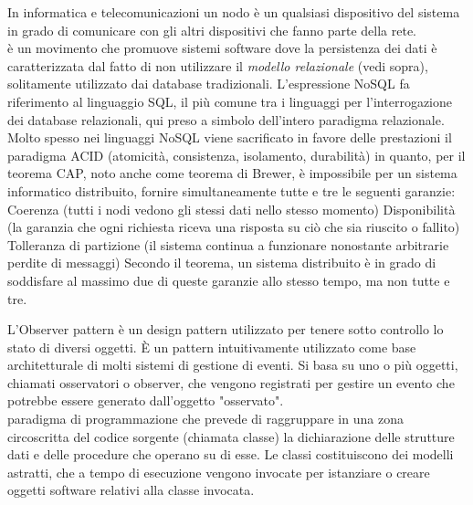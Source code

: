 \documentclass{scalatekids-article}
\begin{document}

   In informatica e telecomunicazioni un nodo è un qualsiasi dispositivo del sistema in grado di comunicare con gli altri dispositivi che fanno parte della rete.
  \\

   è un movimento che promuove sistemi software dove la persistenza dei dati è caratterizzata dal fatto di non utilizzare il \textit{modello relazionale} (vedi sopra), solitamente utilizzato dai database tradizionali.
  L'espressione NoSQL fa riferimento al linguaggio SQL, il più comune tra i linguaggi per l'interrogazione dei database relazionali, qui preso a simbolo dell'intero paradigma relazionale. Molto spesso nei linguaggi NoSQL viene sacrificato in favore delle prestazioni il paradigma ACID (atomicità, consistenza, isolamento, durabilità) in quanto, per il teorema CAP, noto anche come teorema di Brewer, è impossibile per un sistema informatico distribuito, fornire simultaneamente tutte e tre le seguenti garanzie:
  Coerenza (tutti i nodi vedono gli stessi dati nello stesso momento)
  Disponibilità (la garanzia che ogni richiesta riceva una risposta su ciò che sia riuscito o fallito)
  Tolleranza di partizione (il sistema continua a funzionare nonostante arbitrarie perdite di messaggi)
  Secondo il teorema, un sistema distribuito è in grado di soddisfare al massimo due di queste garanzie allo stesso tempo, ma non tutte e tre.
  \\


   L'Observer pattern è un design pattern utilizzato per tenere sotto controllo lo stato di diversi oggetti.
  È un pattern intuitivamente utilizzato come base architetturale di molti sistemi di gestione di eventi. 
  Si basa su uno o più oggetti, chiamati osservatori o observer, che vengono registrati per gestire un evento che potrebbe essere generato dall'oggetto "osservato".
  \\

   paradigma di programmazione che prevede di raggruppare in una zona circoscritta del codice sorgente (chiamata classe) la dichiarazione delle strutture dati e delle procedure che operano su di esse. Le classi costituiscono dei modelli astratti, che a tempo di esecuzione vengono invocate per istanziare o creare oggetti software relativi alla classe invocata.
  \\
\end{document}
